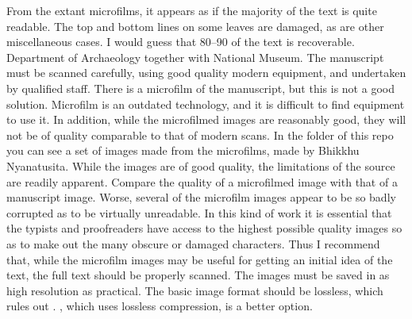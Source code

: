 {}From the extant microfilms, it appears as if the majority of the text is quite readable. The top and bottom lines on some leaves are damaged, as are other miscellaneous cases. I would guess that 80\markdownRendererPercentSign{}–90\markdownRendererPercentSign{} of the text is recoverable.\markdownRendererInterblockSeparator
{}\markdownRendererBlockQuoteBegin
{} Department of Archaeology together with National Museum.
\markdownRendererBlockQuoteEnd \markdownRendererInterblockSeparator
{}\markdownRendererInterblockSeparator
{}The manuscript must be scanned carefully, using good quality modern equipment, and undertaken by qualified staff.\markdownRendererInterblockSeparator
{}There is a microfilm of the manuscript, but this is not a good solution. Microfilm is an outdated technology, and it is difficult to find equipment to use it. In addition, while the microfilmed images are reasonably good, they will not be of quality comparable to that of modern scans. In the  folder of this repo you can see a set of images made from the microfilms, made by Bhikkhu Nyanatusita. While the images are of good quality, the limitations of the source are readily apparent. Compare the quality of a microfilmed image with that of a manuscript image.\markdownRendererInterblockSeparator
{}\markdownRendererInterblockSeparator
{}\markdownRendererInterblockSeparator
{}Worse, several of the microfilm images appear to be so badly corrupted as to be virtually unreadable.\markdownRendererInterblockSeparator
{}\markdownRendererInterblockSeparator
{}In this kind of work it is essential that the typists and proofreaders have access to the highest possible quality images so as to make out the many obscure or damaged characters. Thus I recommend that, while the microfilm images may be useful for getting an initial idea of the text, the full text should be properly scanned.\markdownRendererInterblockSeparator
{}The images must be saved in as high resolution as practical. The basic image format should be lossless, which rules out . , which uses lossless compression, is a better option.\markdownRendererInterblockSeparator
